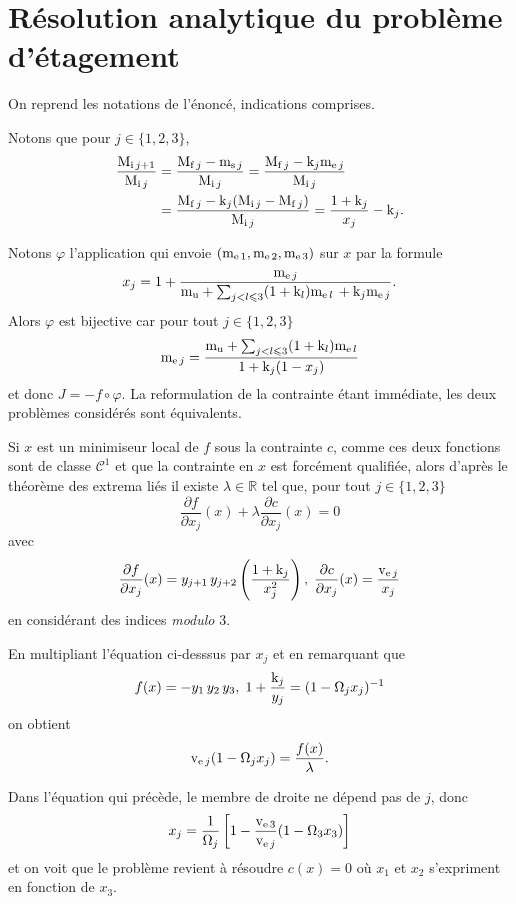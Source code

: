 \section{Résolution analytique du problème d'étagement}

On reprend les notations de l'énoncé, indications comprises.

\question Notons que pour $j\in\{1,2,3\}$,
\begin{align*}
\dfrac{\initmass{j+1}}{\initmass{j}} &= \dfrac{\finalmass{j}-\massstruct{j}}{\initmass{j}} =%
\dfrac{\finalmass{j}-\constructidx{j}\masspropel{j}}{\initmass{j}} \\ &= \dfrac{\finalmass{j}-\constructidx{j}(\initmass{j}-\finalmass{j})}{\initmass{j}} = \dfrac{1+\constructidx{j}}{x_{j}}-\constructidx{j}\text{.}
\end{align*}

Notons $\varphi$ l'application qui envoie $(\mathrm{m}_{\mathrm{e}\,1},\mathrm{m}_{\mathrm{e}\,2},\mathrm{m}_{\mathrm{e}\,3})$ sur $x$ par la formule
\[x_{j} = 1 + \dfrac{\mathrm{m}_{\mathrm{e}\,j}}{\mathrm{m}_{\mathrm{u}} + \sum_{j<l\leqslant 3}(1+\mathrm{k}_{l})\mathrm{m}_{\mathrm{e}\,l} \,+ \mathrm{k}_{j}\mathrm{m}_{\mathrm{e}\,j}}\text{.}\]
Alors $\varphi$ est bijective car pour tout $j\in\{1,2,3\}$
\[\mathrm{m}_{\mathrm{e}\,j}=\dfrac{\mathrm{m}_{\mathrm{u}} + \sum_{j<l\leqslant 3}(1+\mathrm{k}_{l})\mathrm{m}_{\mathrm{e}\,l}}{1+\mathrm{k}_{j}(1-x_{j})}\]
et donc $J=-f\circ \varphi$. La reformulation de la contrainte étant immédiate, les deux problèmes considérés sont équivalents.

\question Si $x$ est un minimiseur local de $f$ sous la contrainte $c$, comme ces deux fonctions sont de classe $\mathscr{C}^1$ et que la contrainte en $x$ est forcément qualifiée, alors d'après le théorème des extrema liés il existe $\lambda\in\mathbb{R}$ tel que, pour tout $j\in\{1,2,3\}$
\[\dfrac{\partial f}{\partial x_{j}}(x) + \lambda\dfrac{\partial c}{\partial x_{j}}(x) = 0\]
avec
\[\dfrac{\partial f}{\partial x_{j}}(x) = y_{j+1}\,y_{j+2}\left(\dfrac{1+\constructidx{j}}{x_{j}^{2}}\right)%
,\; \dfrac{\partial c}{\partial x_{j}}(x) = \dfrac{\propellantsvlct{j}}{x_{j}}\]
en considérant des indices \emph{modulo} $3$.

En multipliant l'équation ci-desssus par $x_j$ et en remarquant que
\[f(x)=-y_{1}\,y_{2}\,y_{3},\; 1+\dfrac{\mathrm{k}_{j}}{y_{j}}=(1-\Omega_{j}x_{j})^{-1}\]
on obtient
\[\mathrm{v}_{\mathrm{e}\,j}(1-\Omega_{j}x_{j}) = \dfrac{f(x)}{\lambda}\text{.}\]

\question Dans l'équation qui précède, le membre de droite ne dépend pas de $j$, donc
\[x_{j} = \dfrac{1}{\Omega_{j}}\left[1-\dfrac{\mathrm{v}_{\mathrm{e}\,3}}{\mathrm{v}_{\mathrm{e}\,j}}(1-\Omega_{3}x_{3})\right]\]
et on voit que le problème revient à résoudre $c(x)=0$ où $x_1$ et $x_2$ s'expriment en fonction de $x_3$.

